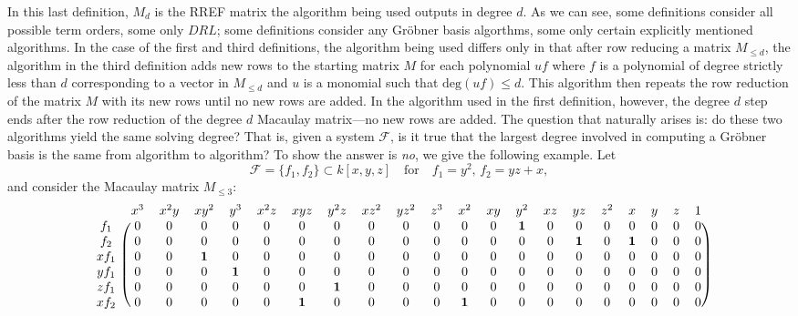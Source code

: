 \documentclass[11pt]{article}
\begin{document}
In this last definition, $M_d$ is the RREF matrix the algorithm being used outputs in degree $d$. As we can see, some definitions consider all possible term orders, some only $DRL$; some definitions consider any Gröbner basis algorthms, some only certain explicitly mentioned algorithms. In the case of the first and third definitions, the algorithm being used differs only in that after row reducing a matrix $M_{\leq d}$, the algorithm in the third definition adds new rows to the starting matrix $M$ for each polynomial $u f$ where $f$ is a polynomial of degree strictly less than $d$ corresponding to a vector in $M_{\leq d}$ and $u$ is a monomial such that $\text{deg}(uf) \leq d$. This algorithm then repeats the row reduction of the matrix $M$ with its new rows until no new rows are added. In the algorithm used in the first definition, however, the degree $d$ step ends after the row reduction of the degree $d$ Macaulay matrix---no new rows are added. The question that naturally arises is: do these two algorithms yield the same solving degree? That is, given a system $\mathcal{F}$, is it true that the largest degree involved in computing a Gröbner basis is the same from algorithm to algorithm? To show the answer is \emph{no}, we give the following example. Let \[ \mathcal{F} = \{f_1,f_2\} \subset k[x,y,z] \quad \text{for} \quad f_1 = y^2, \, f_2 = yz + x, \] and consider the Macaulay matrix $M_{\leq 3}$: \\ \[ \begin{blockarray}{ccccccccccccccccccccc}
	& x^3 & x^2y & xy^2 & y^3 & x^2z & xyz & y^2z & xz^2 & yz^2 & z^3 & x^2 & xy & y^2 & xz & yz & z^2 & x & y & z & 1 \\
	\begin{block}{c(cccccccccccccccccccc)}
		f_1 & 0 & 0 & 0 & 0 & 0 & 0 & 0 & 0 & 0 & 0 & 0 & 0 & \mathbf{1} & 0 & 0 & 0 & 0 & 0 & 0 & 0 \\
		f_2 & 0 & 0 & 0 & 0 & 0 & 0 & 0 & 0 & 0 & 0 & 0 & 0 & 0 & 0 & \mathbf{1} & 0 & \mathbf{1} & 0 & 0 & 0 \\
		xf_1 & 0 & 0 & \mathbf{1} & 0 & 0 & 0 & 0 & 0 & 0 & 0 & 0 & 0 & 0 & 0 & 0 & 0 & 0 & 0 & 0 & 0 \\
		yf_1 & 0 & 0 & 0 & \mathbf{1} & 0 & 0 & 0 & 0 & 0 & 0 & 0 & 0 & 0 & 0 & 0 & 0 & 0 & 0 & 0 & 0 \\
		zf_1 & 0 & 0 & 0 & 0 & 0 & 0 & \mathbf{1} & 0 & 0 & 0 & 0 & 0 & 0 & 0 & 0 & 0 & 0 & 0 & 0 & 0 \\
		xf_2 & 0 & 0 & 0 & 0 & 0 & \mathbf{1} & 0 & 0 & 0 & 0 & \mathbf{1} & 0 & 0 & 0 & 0 & 0 & 0 & 0 & 0 & 0 \\

\end{block}
\end{blockarray}\]
\end{document}
